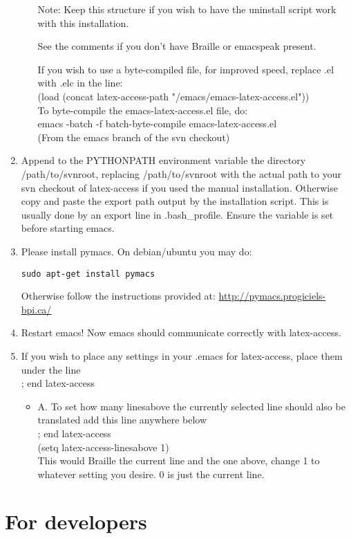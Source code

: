 \documentclass[12pt,a4paper]{report}
\begin{document}
\begin{enumerate}
\begin{itemize}
Note: Keep this structure if you wish to have the uninstall script work
with this installation.

See the comments if you don't have Braille or emacspeak present.

If you wish to use a byte-compiled file, for improved speed, replace .el
with .elc in the line:\\
(load (concat latex-access-path "/emacs/emacs-latex-access.el"))\\

To byte-compile the emacs-latex-access.el file, do:\\
emacs -batch -f batch-byte-compile emacs-latex-access.el\\
(From the emacs branch of the svn checkout)
\end{itemize}
\item 
Append to the PYTHONPATH environment variable the directory
/path/to/svnroot, replacing /path/to/svnroot with the actual path to
your svn checkout of latex-access if you used the manual
installation. Otherwise copy and paste the export path output by the
installation script.
This is usually done by an export line in .bash\_profile.
Ensure the variable is set before starting emacs.
\item Please install pymacs. 
On debian/ubuntu you may do:
\begin{verbatim}
sudo apt-get install pymacs
\end{verbatim}
Otherwise follow the instructions provided at:
\url{http://pymacs.progiciels-bpi.ca/}
\item Restart emacs!
Now emacs should communicate correctly with latex-access.
\item If you wish to place any settings in your .emacs for latex-access,
place them under the line \\
; end latex-access\\
\begin{itemize}
\item A. To set how many linesabove the currently selected line should also be
translated add this line anywhere below\\
; end latex-access \\
(setq latex-access-linesabove 1)\\
This would Braille the current line and the one above, change 1 to
whatever setting you desire. 0 is just the current line.
\end{itemize}
\end{enumerate}

\chapter{For developers}
\label{ch-for-devs}
\end{document}

